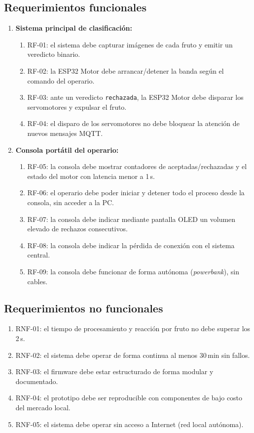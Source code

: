 \documentclass[12pt]{catolica_proyectos}
\begin{document}
\subsection{Requerimientos funcionales}
\begin{enumerate}
  \item \textbf{Sistema principal de clasificación:}
  \begin{enumerate}
    \item RF-01: el sistema debe capturar imágenes de cada fruto y emitir un veredicto binario.
    \item RF-02: la ESP32 Motor debe arrancar/detener la banda según el comando del operario.
    \item RF-03: ante un veredicto \texttt{rechazada}, la ESP32 Motor debe disparar los servomotores y expulsar el fruto.
    \item RF-04: el disparo de los servomotores no debe bloquear la atención de nuevos mensajes MQTT.
  \end{enumerate}
  \item \textbf{Consola portátil del operario:}
  \begin{enumerate}
    \item RF-05: la consola debe mostrar contadores de aceptadas/rechazadas y el estado del motor con latencia menor a 1\,s.
    \item RF-06: el operario debe poder iniciar y detener todo el proceso desde la consola, sin acceder a la PC.
    \item RF-07: la consola debe indicar mediante pantalla OLED un volumen elevado de rechazos consecutivos.
    \item RF-08: la consola debe indicar la pérdida de conexión con el sistema central.
    \item RF-09: la consola debe funcionar de forma autónoma (\emph{powerbank}), sin cables.
  \end{enumerate}
\end{enumerate}

\subsection{Requerimientos no funcionales}
\begin{enumerate}
  \item RNF-01: el tiempo de procesamiento y reacción por fruto no debe superar los 2\,s.
  \item RNF-02: el sistema debe operar de forma continua al menos 30\,min sin fallos.
  \item RNF-03: el firmware debe estar estructurado de forma modular y documentado.
  \item RNF-04: el prototipo debe ser reproducible con componentes de bajo costo del mercado local.
  \item RNF-05: el sistema debe operar sin acceso a Internet (red local autónoma).
\end{enumerate}
\end{document}
